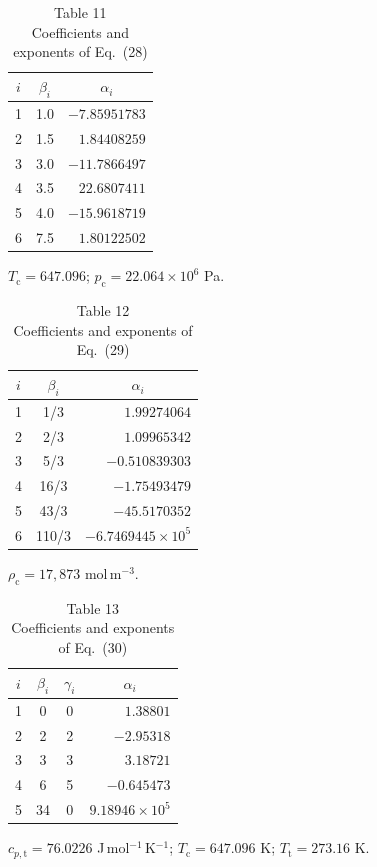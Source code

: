 \documentclass[11pt]{article}
\newcommand{\JmolK}{J\,mol$^{-1}$\,K$^{-1}$}
\newcommand{\molm}{mol\,m$^{-3}$}
\begin{document}
\begin{table}[htbp]
\centering
\caption*{Table 11\\ Coefficients and exponents of Eq.~(28)}
\begin{tabular}{ccr}
\toprule
$i$ & $\beta_i$ & \multicolumn{1}{c}{$\alpha_i$} \\
\midrule
1 & 1.0 & $-7.85951783$ \\
2 & 1.5 & $1.84408259$  \\
3 & 3.0 & $-11.7866497$ \\
4 & 3.5 & $22.6807411$  \\
5 & 4.0 & $-15.9618719$ \\
6 & 7.5 & $1.80122502$  \\
\bottomrule
\end{tabular}

\vspace{2pt}
\footnotesize $T_\mathrm{c} = 647.096$;
$p_\mathrm{c} = 22.064\times10^{6}$ Pa.
\end{table}

\begin{table}[htbp]
\centering
\caption*{Table 12\\ Coefficients and exponents of Eq.~(29)}
\begin{tabular}{ccr}
\toprule
$i$ & $\beta_i$ & \multicolumn{1}{c}{$\alpha_i$} \\
\midrule
1 & 1/3   & $1.99274064$ \\
2 & 2/3   & $1.09965342$ \\
3 & 5/3   & $-0.510839303$ \\
4 & 16/3  & $-1.75493479$ \\
5 & 43/3  & $-45.5170352$ \\
6 & 110/3 & $-6.7469445\times10^{5}$ \\
\bottomrule
\end{tabular}

\vspace{2pt}
\footnotesize $\rho_\mathrm{c} = 17{,}873$ \molm.
\end{table}

\begin{table}[htbp]
\centering
\caption*{Table 13\\ Coefficients and exponents of Eq.~(30)}
\begin{tabular}{cccr}
\toprule
$i$ & $\beta_i$ & $\gamma_i$ & \multicolumn{1}{c}{$\alpha_i$} \\
\midrule
1 & 0  & 0 & $1.38801$ \\
2 & 2  & 2 & $-2.95318$ \\
3 & 3  & 3 & $3.18721$ \\
4 & 6  & 5 & $-0.645473$ \\
5 & 34 & 0 & $9.18946\times10^{5}$ \\
\bottomrule
\end{tabular}

\vspace{2pt}
\footnotesize $c_{p,\mathrm{t}} = 76.0226$ \JmolK;
$T_\mathrm{c} = 647.096$ K; $T_\mathrm{t} = 273.16$ K.
\end{table}
\end{document}
